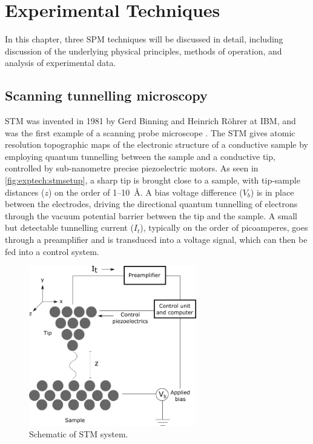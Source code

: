 
\chapter{Experimental Techniques}
\label{ch:exptech}

In this chapter, three \acf{SPM} techniques will be discussed in detail, including discussion of the underlying physical principles, methods of operation, and analysis of experimental data.



\section{Scanning tunnelling microscopy}

\Acf{STM} was invented in 1981 by Gerd Binning and Heinrich R\"ohrer at IBM, and was the first example of a scanning probe microscope \citep{binnig1982surface}. The \ac{STM} gives atomic resolution topographic maps of the electronic structure of a conductive sample by employing quantum tunnelling between the sample and a conductive tip, controlled by sub-nanometre precise piezoelectric motors. As seen in \autoref{fig:exptech:stmsetup}, a sharp tip is brought close to a sample, with tip-sample distances ($z$) on the order of 1--\SI{10}{\angstrom}. A bias voltage difference ($V_b$) is in place between the electrodes, driving the directional quantum tunnelling of electrons through the vacuum potential barrier between the tip and the sample. A small but detectable tunnelling current ($I_t$), typically on the order of picoamperes, goes through a preamplifier and is transduced into a voltage signal, which can then be fed into a control system.

\begin{figure} [h]
    \centering
    \includegraphics[width=0.65\textwidth]{pictures/stm_diagram.png}
    \caption{Schematic of STM system.}
    \label{fig:exptech:stmsetup}
\end{figure}

